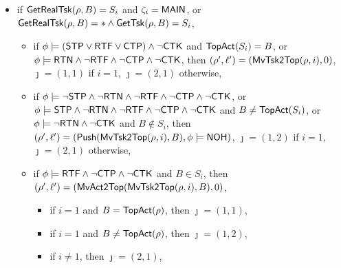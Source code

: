{\begin{itemize}
\begin{itemize}
\begin{itemize}
            \item if $\phi \models\ctpflag\wedge\stpflag\wedge\neg\ctkflag$ and $B \in S_i$, 
			then $(\rho',\ell') =(\clrtop(\mvtsktop(\rho, i), B), 0)$, 
			\begin{itemize}
				\item if $i = 1$ and $B = \topact(\rho)$, then $\jmath = (1,1)$,
				\item if $i = 1$ and $B \neq \topact(\rho)$, then $\jmath = \bot$,
				\item if $i \neq 1$, then $\jmath = (2,1)$,
			\end{itemize}
            \item if $\phi \models\ctkflag$, then
            $(\rho',\ell') = (\clrtsk(\mvtsktop(\rho, i), B),\phi\models\nohflag)$, $\jmath = \bot$ if $i = 1$, $\jmath = (2,1)$ otherwise,
            \end{itemize}
            \item if $\mathsf{GetRealTsk}(\rho, B) = S_i$ and $\zeta_i={\sf MAIN}$,
        or $ \mathsf{GetRealTsk}(\rho, B) = * \wedge \mathsf{GetTsk}(\rho, B) = S_i$, 
		\begin{itemize}
            \item if $\phi \models ({\sf STP}\vee{\sf RTF}\vee{\sf CTP})\wedge\neg{\sf CTK}$ and $\mathsf{TopAct}(S_i) = B$,
            or $\phi \models {\sf RTN} \wedge\neg{\sf RTF}\wedge\neg{\sf CTP}\wedge\neg{\sf CTK}$,
			then $(\rho',\ell')=(\mathsf{MvTsk2Top}(\rho, i), 0)$, $\jmath = (1,1)$ if $i = 1$, $\jmath = (2,1)$ otherwise,
            \item if $\phi\models\neg{\sf STP}\wedge\neg{\sf RTN}\wedge\neg{\sf RTF}\wedge\neg{\sf CTP}\wedge\neg{\sf CTK}$,
                or $\phi\models{\sf STP}\wedge\neg{\sf RTN}\wedge\neg{\sf RTF}\wedge\neg{\sf CTP}\wedge\neg{\sf CTK}$ and $B\neq\mathsf{TopAct}(S_i)$,
                or $\phi\models\neg{\sf RTN}\wedge\neg{\sf CTK}$ and $B\notin S_i$,
				then $(\rho',\ell')=(\mathsf{Push}(\mathsf{MvTsk2Top}(\rho, i), B),\phi\models{\sf NOH})$, $\jmath = (1,2)$ if $i = 1$, $\jmath = (2,1)$ otherwise,
            \item if $\phi \models {\sf RTF} \wedge \neg {\sf CTP}\wedge\neg{\sf CTK}$ and $B \in S_i$, 
			then $(\rho',\ell')=(\mathsf{MvAct2Top}(\mathsf{MvTsk2Top}(\rho, i), B),0)$,
			\begin{itemize}
				\item if $i = 1$ and $B = \topact(\rho)$, then $\jmath = (1,1)$,
				\item if $i = 1$ and $B \neq \topact(\rho)$, then $\jmath = (1,2)$,
				\item if $i \neq 1$, then $\jmath = (2,1)$,

\end{itemize}
\end{itemize}
\end{itemize}
\end{itemize}}
